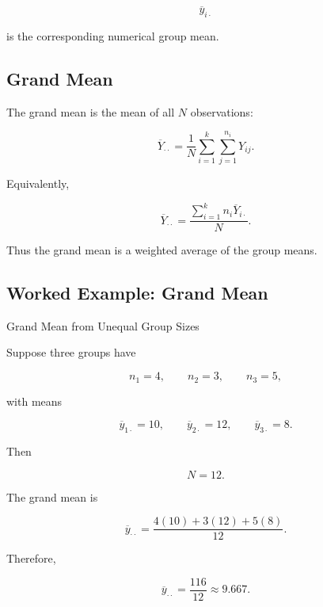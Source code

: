 \[
\overline{y}_{i\cdot}
\]

is the corresponding numerical group mean.

\subsection{Grand Mean}
\label{subsec:anova-grand-mean}

The grand mean is the mean of all \(N\) observations:

\[
\boxed{
\overline{Y}_{\cdot\cdot}
=
\frac1N
\sum_{i=1}^{k}
\sum_{j=1}^{n_i}
Y_{ij}.
}
\]

Equivalently,

\[
\boxed{
\overline{Y}_{\cdot\cdot}
=
\frac{
\sum_{i=1}^{k}
n_i\overline{Y}_{i\cdot}
}{
N
}.
}
\]

Thus the grand mean is a weighted average of the group means.

\subsection{Worked Example: Grand Mean}
\label{subsec:worked-anova-grand-mean}

\begin{workedexamplebox}{Grand Mean from Unequal Group Sizes}

Suppose three groups have

\[
n_1=4,
\qquad
n_2=3,
\qquad
n_3=5,
\]

with means

\[
\overline{y}_{1\cdot}=10,
\qquad
\overline{y}_{2\cdot}=12,
\qquad
\overline{y}_{3\cdot}=8.
\]

Then

\[
N=12.
\]

The grand mean is

\[
\overline{y}_{\cdot\cdot}
=
\frac{
4(10)+3(12)+5(8)
}{
12
}.
\]

Therefore,

\begin{answerbox}
\[
\boxed{
\overline{y}_{\cdot\cdot}
=
\frac{116}{12}
\approx
9.667.
}
\]
\end{answerbox}

\end{workedexamplebox}


